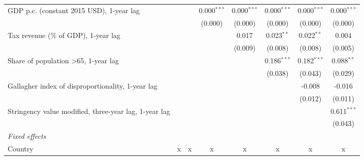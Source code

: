 \begin{table}[htbp]
\begin{tabular}{lccccccc}
      GDP p.c. (constant 2015 USD), 1-year lag                                &                &                & 0.000$^{***}$  & 0.000$^{***}$  & 0.000$^{***}$  & 0.000$^{***}$  & 0.000$^{***}$\\   
                                                                              &                &                & (0.000)        & (0.000)        & (0.000)        & (0.000)        & (0.000)\\   
      Tax revenue (\% of GDP), 1-year lag                                     &                &                &                & 0.017          & 0.023$^{**}$   & 0.022$^{**}$   & 0.004\\   
                                                                              &                &                &                & (0.009)        & (0.008)        & (0.008)        & (0.005)\\   
      Share of population >65, 1-year lag                                     &                &                &                &                & 0.186$^{***}$  & 0.182$^{***}$  & 0.088$^{**}$\\   
                                                                              &                &                &                &                & (0.038)        & (0.043)        & (0.029)\\   
      Gallagher index of disproportionality, 1-year lag                       &                &                &                &                &                & -0.008         & -0.016\\   
                                                                              &                &                &                &                &                & (0.012)        & (0.011)\\   
      Stringency value modified, three-year lag, 1-year lag                   &                &                &                &                &                &                & 0.611$^{***}$\\   
                                                                              &                &                &                &                &                &                & (0.043)\\   
      \emph{Fixed effects}\\
      Country                                                                 & x              & x              & x              & x              & x              & x              & x\\  

\end{tabular}
\end{table}
